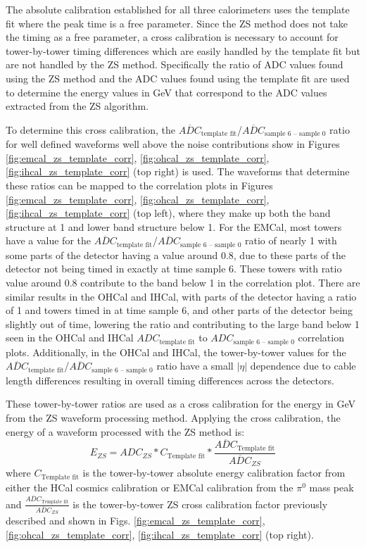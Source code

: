 The absolute calibration established for all three calorimeters uses the template fit where the peak time is a free parameter. 
Since the ZS method does not take the timing as a free parameter, a cross calibration is necessary to account for tower-by-tower timing differences which are easily handled by the template fit but are not handled by the ZS method. 
Specifically the ratio of ADC values found using the ZS method and the ADC values found using the template fit are used to determine the energy values in GeV that correspond to the ADC values extracted from the ZS algorithm. 

To determine this cross calibration, the $\overline{ADC}_{\text{template fit}}$/$\overline{ADC}_{\text{sample 6 – sample 0}}$ ratio for well defined waveforms well above the noise contributions show in Figures \ref{fig:emcal_zs_template_corr}, \ref{fig:ohcal_zs_template_corr}, \ref{fig:ihcal_zs_template_corr} (top right) is used. 
The waveforms that determine these ratios can be mapped to the correlation plots in Figures \ref{fig:emcal_zs_template_corr}, \ref{fig:ohcal_zs_template_corr}, \ref{fig:ihcal_zs_template_corr} (top left), where they make up both the band structure at 1 and lower band structure below 1. 
For the EMCal, most towers have a value for the $\overline{ADC}_{\text{template fit}}$/$\overline{ADC}_{\text{sample 6 – sample 0}}$ ratio of nearly 1 with some parts of the detector having a value around 0.8, due to these parts of the detector not being timed in exactly at time sample 6. 
These towers with ratio value around 0.8 contribute to the band below 1 in the correlation plot. 
There are similar results in the OHCal and IHCal, with parts of the detector having a ratio of 1 and towers timed in at time sample 6, and other parts of the detector being slightly out of time, lowering the ratio and contributing to the large band below 1 seen in the OHCal and IHCal $ADC_{\text{template fit}}$ to $ADC_{\text{sample 6 – sample 0}}$ correlation plots. 
Additionally, in the OHCal and IHCal, the tower-by-tower values for the $\overline{ADC}_{\text{template fit}}$/$\overline{ADC}_{\text{sample 6 – sample 0}}$ ratio have a small $|\eta|$ dependence due to cable length differences resulting in overall timing differences across the detectors.

These tower-by-tower ratios are used as a cross calibration for the energy in GeV from the ZS waveform processing method. 
Applying the cross calibration, the energy of a waveform processed with the ZS method is:
\begin{equation}
    E_{ZS} = ADC_{ZS} * C_{\text{Template fit}} * \frac{\overline{ADC}_{\text{Template fit}}}{\overline{{ADC}}_{ZS}}
\end{equation}
where $C_{\text{Template fit}}$ is the tower-by-tower absolute energy calibration factor from either the HCal cosmics calibration or EMCal calibration from the $\pi^{0}$ mass peak and $\frac{\overline{ADC}_{\text{Template fit}}}{\overline{ADC}_{ZS}}$ is the tower-by-tower ZS cross calibration factor previously described and shown in Figs. \ref{fig:emcal_zs_template_corr}, \ref{fig:ohcal_zs_template_corr}, \ref{fig:ihcal_zs_template_corr} (top right).

